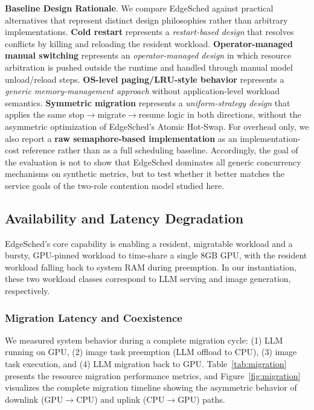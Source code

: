 \textbf{Baseline Design Rationale}. We compare EdgeSched against practical alternatives that represent distinct design philosophies rather than arbitrary implementations. \textbf{Cold restart} represents a \emph{restart-based design} that resolves conflicts by killing and reloading the resident workload. \textbf{Operator-managed manual switching} represents an \emph{operator-managed design} in which resource arbitration is pushed outside the runtime and handled through manual model unload/reload steps. \textbf{OS-level paging/LRU-style behavior} represents a \emph{generic memory-management approach} without application-level workload semantics. \textbf{Symmetric migration} represents a \emph{uniform-strategy design} that applies the same stop$\rightarrow$migrate$\rightarrow$resume logic in both directions, without the asymmetric optimization of EdgeSched's Atomic Hot-Swap. For overhead only, we also report a \textbf{raw semaphore-based implementation} as an implementation-cost reference rather than as a full scheduling baseline. Accordingly, the goal of the evaluation is not to show that EdgeSched dominates all generic concurrency mechanisms on synthetic metrics, but to test whether it better matches the service goals of the two-role contention model studied here.

\subsection{Availability and Latency Degradation}

EdgeSched's core capability is enabling a resident, migratable workload and a bursty, GPU-pinned workload to time-share a single 8GB GPU, with the resident workload falling back to system RAM during preemption. In our instantiation, these two workload classes correspond to LLM serving and image generation, respectively.

\subsubsection{Migration Latency and Coexistence}

We measured system behavior during a complete migration cycle: (1) LLM running on GPU, (2) image task preemption (LLM offload to CPU), (3) image task execution, and (4) LLM migration back to GPU. Table~\ref{tab:migration} presents the resource migration performance metrics, and Figure~\ref{fig:migration} visualizes the complete migration timeline showing the asymmetric behavior of downlink (GPU$\rightarrow$CPU) and uplink (CPU$\rightarrow$GPU) paths.


